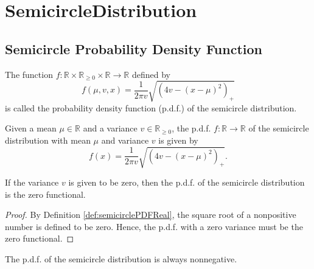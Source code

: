 \chapter{SemicircleDistribution}

\section{Semicircle Probability Density Function}



\begin{definition}\label{def:semicirclePDFReal}
  \mathlibok 
    The function $f : \mathbb{R} \times \mathbb{R}_{\geq 0} \times \mathbb{R} \rightarrow \mathbb{R}$ defined by
   \[
    f(\mu,v,x) 
    = \frac{1}{2πv} \sqrt{(4v - (x - μ)^2)_+}
   \]
   is called the probability density function (p.d.f.) of the semicircle distribution.
\end{definition}
\begin{lemma}\label{lem:semicirclePDFReal_def}
  \mathlibok 
    Given a mean $\mu \in \mathbb{R}$ and a variance $v \in \mathbb{R}_{\geq 0}$, the p.d.f. $f : \mathbb{R} \rightarrow \mathbb{R}$ 
    of the semicircle distribution with mean $\mu$ and variance $v$ is given by
  \[
    f(x) = 
    \frac{1}{2πv} \sqrt{(4v - (x - μ)^2)_+}.
  \]
\end{lemma}
\begin{lemma}\label{lem:semicirclePDFReal_zero_var}
    \mathlibok
    If the variance $v$ is given to be zero, then the p.d.f. of the semicircle distribution is the zero functional.
\end{lemma}
\begin{proof}
    By Definition \ref{def:semicirclePDFReal}, the square root of a nonpositive number is defined to be zero.
    Hence, the p.d.f. with a zero variance must be the zero functional.
\end{proof}
\begin{lemma}\label{lem:semicirclePDFReal_nonneg}
    \mathlibok
    The p.d.f. of the semicircle distribution is always nonnegative. 
\end{lemma}
